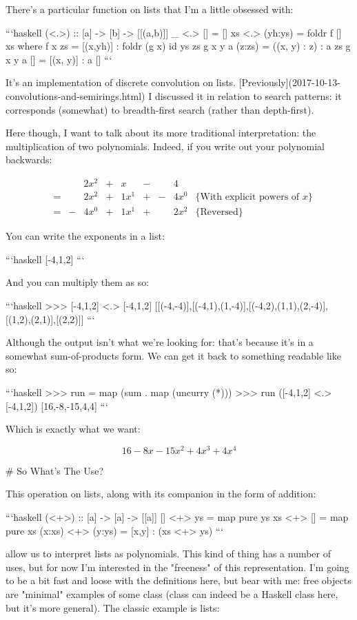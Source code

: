 \documentclass{article}
\begin{document}
There's a particular function on lists that I'm a little obsessed with:

```haskell
(<.>) :: [a] -> [b] -> [[(a,b)]]
_ <.> [] = []
xs <.> (yh:ys) = foldr f [] xs
  where
    f x zs = [(x,yh)] : foldr (g x) id ys zs
    g x y a (z:zs) = ((x, y) : z) : a zs
    g x y a [] = [(x, y)] : a []
```

It's an implementation of discrete convolution on lists.
[Previously](2017-10-13-convolutions-and-semirings.html) I discussed it in
relation to search patterns: it corresponds (somewhat) to breadth-first search
(rather than depth-first).

Here though, I want to talk about its more traditional interpretation: the
multiplication of two polynomials. Indeed, if you write out your polynomial
backwards:

\begin{align}
&   &   & 2x^2 & + & x    & - &   & 4    & \\
& = &   & 2x^2 & + & 1x^1 & + & - & 4x^0 &  \{ \text{With explicit powers of $x$} \} \\
& = & - & 4x^0 & + & 1x^1 & + &   & 2x^2 & \{ \text{Reversed} \}
\end{align}

You can write the exponents in a list:

```haskell
[-4,1,2]
```

And you can multiply them as so:

```haskell
>>> [-4,1,2] <.> [-4,1,2]
[[(-4,-4)],[(-4,1),(1,-4)],[(-4,2),(1,1),(2,-4)],[(1,2),(2,1)],[(2,2)]]
```

Although the output isn't what we're looking for: that's because it's in a
somewhat sum-of-products form. We can get it back to something readable like so:

```haskell
>>> run = map (sum . map (uncurry (*)))
>>> run ([-4,1,2] <.> [-4,1,2])
[16,-8,-15,4,4]
```

Which is exactly what we want:

$$16 - 8x -15x^2 + 4x^3 + 4x^4$$

# So What's The Use?

This operation on lists, along with its companion in the form of addition:

```haskell
(<+>) :: [a] -> [a] -> [[a]]
[] <+> ys = map pure ys
xs <+> [] = map pure xs
(x:xs) <+> (y:ys) = [x,y] : (xs <+> ys)
```

allow us to interpret lists as polynomials. This kind of thing has a number of
uses, but for now I'm interested in the "freeness" of this representation. I'm
going to be a bit fast and loose with the definitions here, but bear with me:
free objects are "minimal" examples of some class (class can indeed be a Haskell
class here, but it's more general). The classic example is lists:
\end{document}
